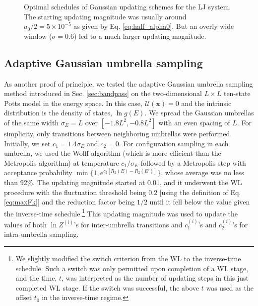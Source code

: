 \documentclass[preprint, superscriptaddress, floatfix]{revtex4-1}
\begin{document}
\begin{figure}[h]
\begin{center}
  \caption{
    \label{fig:lj_alpha}
    Optimal schedules of Gaussian updating schemes
    for the LJ system.
    The starting updating magnitude was usually
    around $a_0/2 = 5\times10^{-5}$
    as given by Eq. \eqref{eq:half_alpha0}.
    But an overly wide window ($\sigma = 0.6$)
    led to a much larger updating magnitude.
  }
\end{center}
\end{figure}




\subsection{\label{sec:potts}
Adaptive Gaussian umbrella sampling}


As another proof of principle,
we tested the adaptive Gaussian umbrella sampling method
introduced in Sec. \ref{sec:bandpass}
on the two-dimensional $L\times L$ ten-state
Potts model\cite{wu1982, newman, wang2001, wang2001pre}
in the energy space.
%
In this case, $\mathcal U(\mathbf x) = 0$
and the intrinsic distribution is
the density of states, $\ln g(E)$.
%
We spread the Gaussian umbrellas
of the same width $\sigma_E = L$ over $[-1.8L^2, -0.8L^2]$
with an even spacing of $L$.
%
For simplicity,
only transitions between neighboring umbrellas
were performed.
%
Initially, we set $c_1 = 1.4 \sigma_E$ and $c_2 = 0$.
%
For configuration sampling in each umbrella,
we used the Wolff algorithm\cite{wolff1989, newman}
(which is more efficient than the Metropolis algorithm)
at temperature $c_1/\sigma_E$
followed by a Metropolis step with
acceptance probability
$\min\bigl\{1, e^{c_2 [R_2(E) - R_2(E')]} \bigr\}$,
whose average was no less than 92\%.
%
The updating magnitude started at $0.01$,
and it underwent the WL procedure
with the fluctuation threshold being $0.2$
[using the definition of Eq. \eqref{eq:maxFk}]
and the reduction factor being $1/2$
until it fell below
the value given the inverse-time schedule.\footnote{We
  slightly modified the switch criterion from the WL
  to the inverse-time schedule\cite{belardinelli2007,
  *belardinelli2007jcp, *belardinelli2008, *belardinelli2016}.
  Such a switch was only permitted
  upon completion of a WL stage,
  and the time, $t$, was interpreted as the number of updating steps
  in this just completed WL stage.
  If the switch was successful,
  the above $t$ was used as the offset $t_0$
  in the inverse-time regime.}
%
This updating magnitude was
used to update the values of both $\ln Z^{(i)}$'s
for inter-umbrella transitions
and $c_1^{(i)}$'s and $c_2^{(i)}$'s
for intra-umbrella sampling.
\end{document}
